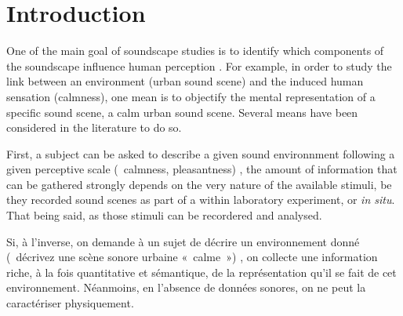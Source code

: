 \documentclass[twoside,twocolumn]{article}
\begin{document}

\setlength{\parindent}{5ex}

\section{Introduction}
\label{sec:intro}


One of the main goal of soundscape studies is to identify which components of the soundscape influence human perception \cite{aletta2016soundscape}. For example, in order to study the link between an environment (urban sound scene) and the induced human sensation (calmness), one mean is to objectify the mental representation of a specific sound scene, a calm urban sound scene. Several means have been considered in the literature to do so.


First, a subject can be asked to describe a given sound environnment following a given perceptive scale (\eg~calmness, pleasantness) \cite{axelsson2005soundscape,davies2013perception,cain2013development}, the amount of information that can be gathered strongly depends on the very nature of the available stimuli, be they recorded sound scenes as part of a within laboratory experiment, or \emph{in situ}. That being said, as those stimuli can be recordered and analysed.

Si, à l'inverse, on demande à un sujet de décrire un environnement donné (\eg~décrivez une scène sonore urbaine «~calme~») \cite{guastavino2006ideal, dubois2006cognitive}, on collecte une information riche, à la fois quantitative et sémantique, de la représentation qu'il se fait de cet environnement. Néanmoins, en l'absence de données sonores, on ne peut la caractériser physiquement.
\end{document}
